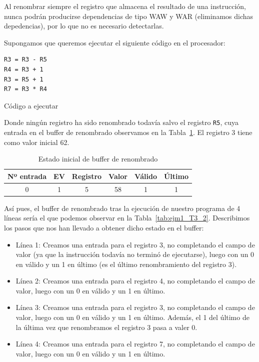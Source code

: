 Al renombrar siempre el registro que almacena el resultado de una instrucción, nunca podrán producirse dependencias de tipo WAW y WAR (eliminamos dichas depedencias), por lo que no es necesario detectarlas.

\begin{ejemplo}
    Supongamos que queremos ejecutar el siguiente código en el procesador:
    \begin{listing}[H]
    \begin{verbatim}
R3 = R3 - R5
R4 = R3 + 1
R3 = R5 + 1
R7 = R3 * R4
    \end{verbatim}
    \caption{Código a ejecutar}
    \label{cod:ejm1_T3}
    \end{listing}
    Donde ningún registro ha sido renombrado todavía salvo el registro \verb|R5|, cuya entrada en el buffer de renombrado observamos en la Tabla~\ref{tab:ejm1_T3}. El registro 3 tiene como valor inicial 62.
    \begin{table}[H]
    \centering
    \begin{tabular}{|c|c|c|c|c|c|}
        \hline
        Nº entrada & EV & Registro & Valor & Válido & Último \\
        \hline
        0 & 1 & 5 & 58 & 1 & 1 \\
        \hline
    \end{tabular}
    \caption{Estado inicial de buffer de renombrado}
    \label{tab:ejm1_T3}
    \end{table}
    Así pues, el buffer de renombrado tras la ejecución de nuestro programa de 4 líneas sería el que podemos observar en la Tabla~\ref{tab:ejm1_T3_2}. Describimos los pasos que nos han llevado a obtener dicho estado en el buffer:
    \begin{itemize}
        \item Línea 1: Creamos una entrada para el registro 3, no completando el campo de valor (ya que la instrucción todavía no terminó de ejecutarse), luego con un 0 en válido y un 1 en último (es el último renombramiento del registro 3).
        \item Línea 2: Creamos una entrada para el registro 4, no completando el campo de valor, luego con un 0 en válido y un 1 en último.
        \item Línea 3: Creamos una entrada para el registro 3, no completando el campo de valor, luego con un 0 en válido y un 1 en último. Además, el 1 del último de la última vez que renombramos el registro 3 pasa a valer 0.
        \item Línea 4: Creamos una entrada para el registro 7, no completando el campo de valor, luego con un 0 en válido y un 1 en último.

\end{itemize}
\end{ejemplo}

